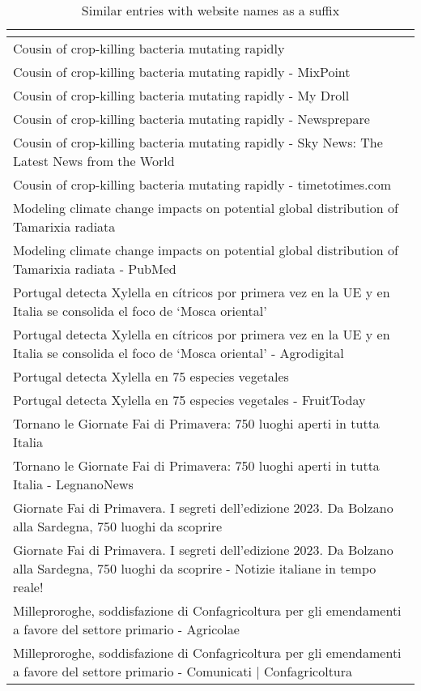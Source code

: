 \begin{table}[!htbp]
  \centering
  \begin{tabular}{p{\textwidth}}
    \hline
    \textbf{\trafilaturaTitle{}} \\
    \hline
    Cousin of crop-killing bacteria mutating rapidly \\
    Cousin of crop-killing bacteria mutating rapidly - MixPoint \\
    Cousin of crop-killing bacteria mutating rapidly - My Droll \\
    Cousin of crop-killing bacteria mutating rapidly - Newsprepare \\
    Cousin of crop-killing bacteria mutating rapidly - Sky News: The Latest News from the World \\
    Cousin of crop-killing bacteria mutating rapidly - timetotimes.com \\
    \hline
    Modeling climate change impacts on potential global distribution of Tamarixia radiata \\
    Modeling climate change impacts on potential global distribution of Tamarixia radiata - PubMed \\
    \hline
    Portugal detecta Xylella en cítricos por primera vez en la UE y en Italia se consolida el foco de ‘Mosca oriental’\\
    Portugal detecta Xylella en cítricos por primera vez en la UE y en Italia se consolida el foco de ‘Mosca oriental’ - Agrodigital \\
    \hline
    Portugal detecta Xylella en 75 especies vegetales\\
    Portugal detecta Xylella en 75 especies vegetales - FruitToday \\
    \hline
    Tornano le Giornate Fai di Primavera: 750 luoghi aperti in tutta Italia\\
    Tornano le Giornate Fai di Primavera: 750 luoghi aperti in tutta Italia - LegnanoNews \\
    \hline
    Giornate Fai di Primavera. I segreti dell'edizione 2023. Da Bolzano alla Sardegna, 750 luoghi da scoprire\\
    Giornate Fai di Primavera. I segreti dell'edizione 2023. Da Bolzano alla Sardegna, 750 luoghi da scoprire - Notizie italiane in tempo reale! \\
    \hline
    Milleproroghe, soddisfazione di Confagricoltura per gli emendamenti a favore del settore primario - Agricolae \\
    Milleproroghe, soddisfazione di Confagricoltura per gli emendamenti a favore del settore primario - Comunicati | Confagricoltura \\
    \hline
  \end{tabular}
  \caption{Similar entries with website names as a suffix}
  \label{tab:04_website_names_as_suffixes}
\end{table}